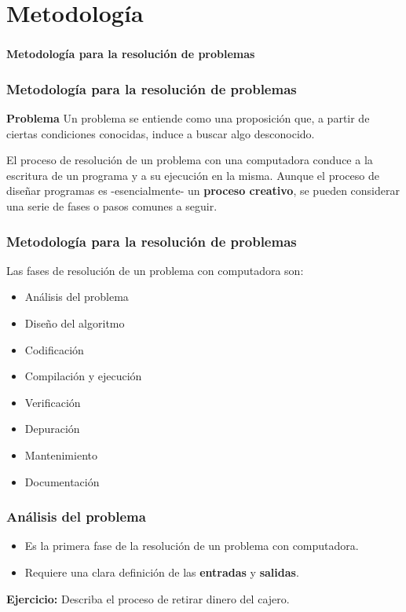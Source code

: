 \setlength{\parskip}{\baselineskip} 
\section*{Metodología}

\begin{frame}[c] 
\frametitle{}
\centering
\huge \textbf{Metodología para la resolución de problemas}
\end{frame}

\begin{frame}[t]
\frametitle{Metodología para la resolución de problemas}
\begin{block}{\textbf{Problema}}
Un problema se entiende como una proposición que, a partir de ciertas condiciones conocidas, induce a buscar algo desconocido.
\end{block}
El proceso de resolución de un problema con una computadora conduce a la escritura de un programa y a su ejecución en la misma. Aunque el proceso de diseñar programas es -esencialmente- un \textbf{proceso creativo}, se pueden considerar una serie de fases o pasos comunes a seguir.
\end{frame}

\begin{frame}[t]
\frametitle{Metodología para la resolución de problemas}
Las fases de resolución de un problema con computadora son:
\begin{itemize}
    \item Análisis del problema \pause
    \item Diseño del algoritmo \pause
    \item Codificación \pause
    \item Compilación y ejecución \pause
    \item Verificación \pause
    \item Depuración \pause
    \item Mantenimiento \pause
    \item Documentación
\end{itemize}
\end{frame}

\begin{frame}[t]
\frametitle{Análisis del problema}
\begin{itemize}
    \item Es la primera fase de la resolución de un problema con computadora.
    \item Requiere una clara definición de las \textbf{entradas} y \textbf{salidas}.
\end{itemize}
\textbf{Ejercicio:} Describa el proceso de retirar dinero del cajero.
\end{frame}

